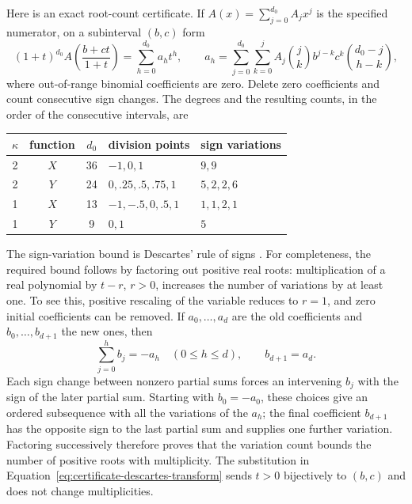 Here is an exact root-count certificate.  If
$A(x)=\sum_{j=0}^{d_0}A_jx^j$ is the specified numerator, on a subinterval
$(b,c)$ form
\begin{equation}\label{eq:certificate-descartes-transform}
 (1+t)^{d_0}A\left(\frac{b+ct}{1+t}\right)
 =\sum_{h=0}^{d_0}a_ht^h,\qquad
 a_h=\sum_{j=0}^{d_0}\sum_{k=0}^j
 A_j\binom jk b^{j-k}c^k\binom{d_0-j}{h-k},
\end{equation}
where out-of-range binomial coefficients are zero.  Delete zero
coefficients and count consecutive sign changes.  The degrees and the
resulting counts, in the order of the consecutive intervals, are
\begin{center}
\begin{tabular}{cccll}
\toprule
$\kappa$&function&$d_0$&division points&sign variations\\
\midrule
2&$X$&36&$-1,0,1$&$9,9$\\
2&$Y$&24&$0,.25,.5,.75,1$&$5,2,2,6$\\
1&$X$&13&$-1,-.5,0,.5,1$&$1,1,2,1$\\
1&$Y$&9&$0,1$&$5$\\
\bottomrule
\end{tabular}
\end{center}
The sign-variation bound is Descartes' rule of signs
\cite[Book~III, p.~373]{Descartes1637}.
For completeness, the required bound follows by factoring
out positive real roots: multiplication of a real polynomial by $t-r$,
$r>0$, increases the number of variations by at least one.  To see this,
positive rescaling of the variable reduces to $r=1$, and zero initial
coefficients can be removed.  If $a_0,\ldots,a_d$ are the old coefficients
and $b_0,\ldots,b_{d+1}$ the new ones, then
\[
 \sum_{j=0}^h b_j=-a_h\quad(0\le h\le d),\qquad b_{d+1}=a_d.
\]
Each sign change between nonzero partial sums forces an intervening $b_j$
with the sign of the later partial sum.  Starting with $b_0=-a_0$,
these choices give an ordered subsequence with all the variations of the
$a_h$; the final coefficient $b_{d+1}$ has the opposite sign to the last
partial sum and supplies one further variation.  Factoring successively
therefore proves that the variation count bounds
the number of positive roots with multiplicity.  The substitution in
Equation~\eqref{eq:certificate-descartes-transform} sends $t>0$ bijectively
to $(b,c)$ and does not change multiplicities.

